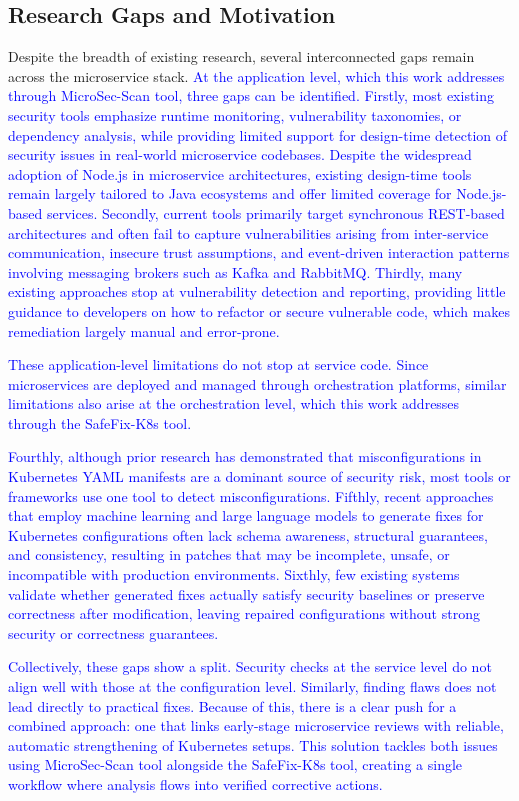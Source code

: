 \documentclass[preprint,12pt]{elsarticle}
\newcommand{\new}[1]{\textcolor{blue}{#1}}
\begin{document}
\subsection{Research Gaps and Motivation}
Despite the breadth of existing research, several interconnected gaps remain across the microservice stack.
\new{
At the application level, which this work addresses through MicroSec-Scan tool, three gaps can be identified. Firstly, most existing security tools emphasize runtime monitoring, vulnerability taxonomies, or dependency analysis, while providing limited support for design-time detection of security issues in real-world microservice codebases. Despite the widespread adoption of Node.js in microservice architectures, existing design-time tools remain largely tailored to Java ecosystems and offer limited coverage for Node.js-based services. Secondly, current tools primarily target synchronous REST-based architectures and often fail to capture vulnerabilities arising from inter-service communication, insecure trust assumptions, and event-driven interaction patterns involving messaging brokers such as Kafka and RabbitMQ. Thirdly, many existing approaches stop at vulnerability detection and reporting, providing little guidance to developers on how to refactor or secure vulnerable code, which makes remediation largely manual and error-prone.
}

\new{
These application-level limitations do not stop at service code. Since microservices are deployed and managed through orchestration platforms, similar limitations also arise at the orchestration level, which this work addresses through the SafeFix-K8s tool.
}

\new{
Fourthly, although prior research has demonstrated that misconfigurations in Kubernetes YAML manifests are a dominant source of security risk, most tools or frameworks use one tool to detect misconfigurations. Fifthly, recent approaches that employ machine learning and large language models to generate fixes for Kubernetes configurations often lack schema awareness, structural guarantees, and consistency, resulting in patches that may be incomplete, unsafe, or incompatible with production environments. Sixthly, few existing systems validate whether generated fixes actually satisfy security baselines or preserve correctness after modification, leaving repaired configurations without strong security or correctness guarantees.
}

\new{
Collectively, these gaps show a split. Security checks at the service level do not align well with those at the configuration level. Similarly, finding flaws \new{does not} lead directly to practical fixes. Because of this, there is a clear push for a combined approach: one that links early-stage microservice reviews with reliable, automatic strengthening of Kubernetes setups. This solution tackles both issues using MicroSec-Scan tool alongside the SafeFix-K8s tool, creating a single workflow where analysis flows into verified corrective actions.
}
\end{document}
